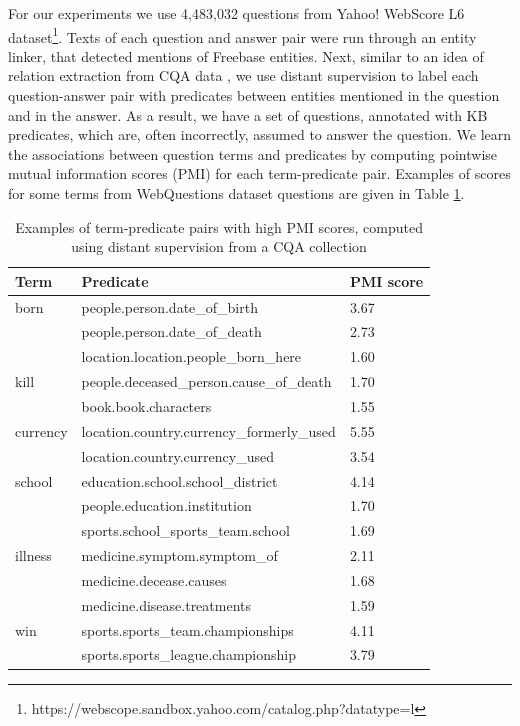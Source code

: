 For our experiments we use 4,483,032 questions from Yahoo! WebScore L6 dataset\footnote{https://webscope.sandbox.yahoo.com/catalog.php?datatype=l}.
Texts of each question and answer pair were run through an entity linker, that detected mentions of Freebase entities.
Next, similar to an idea of relation extraction from CQA data \cite{savenkov-EtAl:2015:SRW}, we use distant supervision to label each question-answer pair with predicates between entities mentioned in the question and in the answer.
As a result, we have a set of questions, annotated with KB predicates, which are, often incorrectly, assumed to answer the question.
We learn the associations between question terms and predicates by computing pointwise mutual information scores (PMI) for each term-predicate pair.
Examples of scores for some terms from WebQuestions dataset questions are given in Table \ref{table:cqa_npmi}.

\begin{table}
\caption{Examples of term-predicate pairs with high PMI scores, computed using distant supervision from a CQA collection}
\label{table:cqa_npmi}
\begin{tabular}{| p{1cm} | p{5.5cm} | p{0.75cm} |}
\hline
Term & Predicate & PMI score\\
\hline
born & people.person.date\_of\_birth & 3.67\\
 & people.person.date\_of\_death & 2.73\\
 & location.location.people\_born\_here & 1.60\\
\hline
kill & people.deceased\_person.cause\_of\_death & 1.70\\
& book.book.characters & 1.55\\
\hline
currency & location.country.currency\_formerly\_used & 5.55 \\
& location.country.currency\_used & 3.54 \\
\hline
school & education.school.school\_district & 4.14 \\
& people.education.institution & 1.70\\
& sports.school\_sports\_team.school & 1.69 \\
\hline
illness & medicine.symptom.symptom\_of & 2.11\\
& medicine.decease.causes & 1.68\\
& medicine.disease.treatments & 1.59\\
\hline
win & sports.sports\_team.championships & 4.11\\
& sports.sports\_league.championship & 3.79\\
\hline
\end{tabular}
\end{table}

